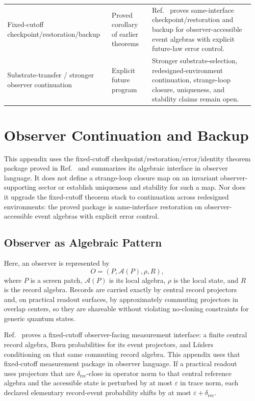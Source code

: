 \begin{center}
\begin{tabular}{@{}>{\raggedright\arraybackslash}p{}>{\raggedright\arraybackslash}p{}>{\raggedright\arraybackslash}p{}@{}}
Fixed-cutoff checkpoint/restoration/backup & Proved corollary of earlier theorems & Ref.~\cite{ophmicrophysics} proves same-interface checkpoint/restoration and backup for observer-accessible event algebras with explicit future-law error control. \\
Substrate-transfer / stronger observer continuation & Explicit future program & Stronger substrate-selection, redesigned-environment continuation, strange-loop closure, uniqueness, and stability claims remain open. \\
\bottomrule
\end{tabular}
\end{center}

\section{Observer Continuation and Backup}

This appendix uses the fixed-cutoff checkpoint/restoration/error/identity theorem package proved
in Ref.~\cite{ophmicrophysics} and summarizes its algebraic interface in observer language. It
does not define a strange-loop closure map on an invariant observer-supporting sector or establish
uniqueness and stability for such a map. Nor does it upgrade the fixed-cutoff theorem stack to
continuation across redesigned environments: the proved package is same-interface restoration on
observer-accessible event algebras with explicit error control.

\subsection{Observer as Algebraic Pattern}

Here, an observer is represented by
\[
O=(P,\mathcal{A}(P),\rho,R),
\]
where \(P\) is a screen patch, \(\mathcal{A}(P)\) is its local algebra, \(\rho\) is the local
state, and \(R\) is the record algebra. Records are carried exactly by central record projectors
and, on practical readout surfaces, by approximately commuting projectors in overlap centers, so
they are shareable without violating no-cloning constraints for generic quantum states.

Ref.~\cite{ophmicrophysics} proves a fixed-cutoff observer-facing measurement interface: a
finite central record algebra, Born probabilities for its event projectors, and L\"uders
conditioning on that same commuting record algebra. This appendix uses that fixed-cutoff
measurement package in observer language. If a practical readout uses projectors that are
\(\delta_{\mathrm{rec}}\)-close in operator norm to that central reference algebra and the
accessible state is perturbed by at most \(\varepsilon\) in trace norm, each declared elementary
record-event probability shifts by at most \(\varepsilon+\delta_{\mathrm{rec}}\).

